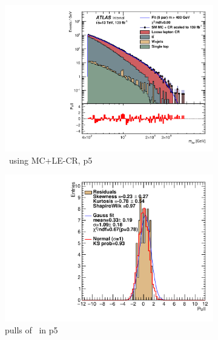 \begin{figure}[H]
\begin{subfigure}[h]{0.38\linewidth}
    \includegraphics[scale=0.3]{figs/ch6/fit/variable_nosmooth/p5/10PB/output_SMMCplusCR_Mbe_p5.pdf}%
     \caption{\mbe \ using MC+LE-CR, p5}
     \end{subfigure}
     \hfill
    \begin{subfigure}[h]{0.4\linewidth}
    \includegraphics[scale=0.32]{figs/ch6/fit/variable_nosmooth/p5/10PB/pull_SMMCplusCR_Mbe_p5.pdf}%
    \caption{pulls of \mbe \ in p5}
    \end{subfigure}
    \hfill
    \begin{subfigure}[h]{0.38\linewidth}

\end{subfigure}
\end{figure}
